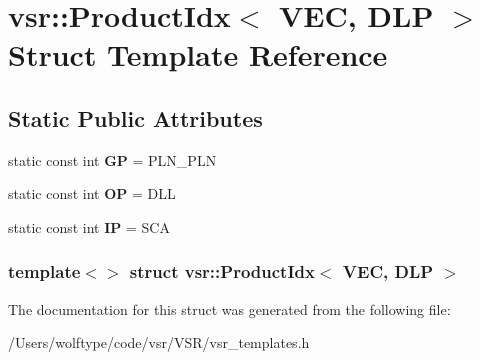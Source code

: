 \hypertarget{structvsr_1_1_product_idx_3_01_v_e_c_00_01_d_l_p_01_4}{\section{vsr\-:\-:Product\-Idx$<$ V\-E\-C, D\-L\-P $>$ Struct Template Reference}
\label{structvsr_1_1_product_idx_3_01_v_e_c_00_01_d_l_p_01_4}
}
\subsection*{Static Public Attributes}
\begin{DoxyCompactItemize}
\item 
\hypertarget{structvsr_1_1_product_idx_3_01_v_e_c_00_01_d_l_p_01_4_a56c45e83026e1497e4b438484931b5a9}{static const int {\bfseries G\-P} = P\-L\-N\-\_\-\-P\-L\-N}\label{structvsr_1_1_product_idx_3_01_v_e_c_00_01_d_l_p_01_4_a56c45e83026e1497e4b438484931b5a9}

\item 
\hypertarget{structvsr_1_1_product_idx_3_01_v_e_c_00_01_d_l_p_01_4_a948c4ada3450c5fab819869b29775d2a}{static const int {\bfseries O\-P} = D\-L\-L}\label{structvsr_1_1_product_idx_3_01_v_e_c_00_01_d_l_p_01_4_a948c4ada3450c5fab819869b29775d2a}

\item 
\hypertarget{structvsr_1_1_product_idx_3_01_v_e_c_00_01_d_l_p_01_4_aed7ad2603b8e28a416b1b5a98d8f0660}{static const int {\bfseries I\-P} = S\-C\-A}\label{structvsr_1_1_product_idx_3_01_v_e_c_00_01_d_l_p_01_4_aed7ad2603b8e28a416b1b5a98d8f0660}

\end{DoxyCompactItemize}
\subsubsection*{template$<$$>$ struct vsr\-::\-Product\-Idx$<$ V\-E\-C, D\-L\-P $>$}



The documentation for this struct was generated from the following file\-:\begin{DoxyCompactItemize}
\item 
/\-Users/wolftype/code/vsr/\-V\-S\-R/vsr\-\_\-templates.\-h\end{DoxyCompactItemize}
